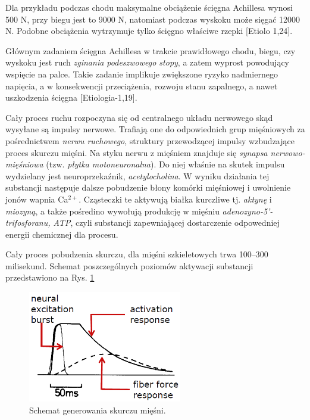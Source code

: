 Dla przykładu podczas chodu maksymalne obciążenie ścięgna Achillesa wynosi 500 N, przy biegu jest to 9000 N, natomiast podczas wyskoku może sięgać 12000 N. Podobne obciążenia wytrzymuje tylko ścięgno właściwe rzepki [Etiolo 1,24].

Głównym zadaniem ścięgna Achillesa w trakcie prawidłowego chodu, biegu, czy wyskoku jest ruch \textit{zginania podeszwowego stopy}, a zatem wyprost powodujący wspięcie na palce. Takie zadanie implikuje zwiększone ryzyko nadmiernego napięcia, a w konsekwencji przeciążenia, rozwoju stanu zapalnego, a nawet uszkodzenia ścięgna [Etiologia-1,19].

Cały proces ruchu rozpoczyna się od centralnego układu nerwowego skąd wysyłane są impulsy nerwowe. Trafiają one do odpowiednich grup mięśniowych za pośrednictwem \textit{nerwu ruchowego}, struktury  przewodzącej impulsy wzbudzające proces skurczu mięśni. Na styku nerwu z mięśniem znajduje się \textit{synapsa nerwowo-mięśniowa} (tzw. \textit{płytka motoneuronalna}). Do niej właśnie na skutek impulsu wydzielany jest neuroprzekaźnik, \textit{acetylocholina}. W wyniku działania tej substancji następuje dalsze pobudzenie błony komórki mięśniowej i uwolnienie jonów wapnia Ca$^{2+}$. Cząsteczki te aktywują białka kurczliwe tj. \textit{aktynę} i \textit{miozyną}, a także pośredino wywołują produkcję w mięśniu \textit{adenozyno-5'-trifosforanu, ATP}, czyli substancji zapewniającej dostarczenie odpowedniej energii chemicznej dla procesu.

Cały proces pobudzenia skurczu, dla mięśni szkieletowych trwa 100--300 milisekund. Schemat poszczególnych poziomów aktywacji substancji przedstawiono na Rys. \ref{muscle-excitements} 
\begin{figure}[h!]
	\centering
	\includegraphics[width=0.6\textwidth]{figures/skurcz_miesni.png}
	\caption{Schemat generowania skurczu mięśni.}
	\label{muscle-excitements}
\end{figure}

